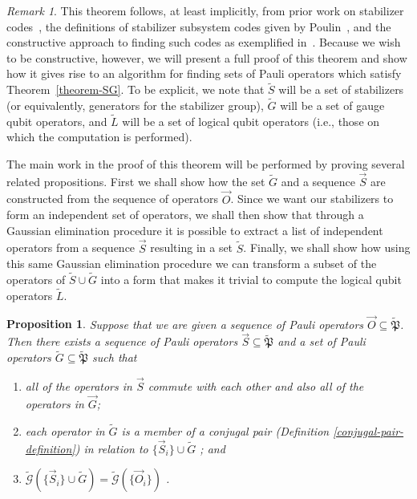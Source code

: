 \documentclass{amsbook}
\theoremstyle{plain}
\newtheorem{proposition}{Proposition}
\theoremstyle{definition}
\theoremstyle{remark}
\newtheorem{remark}{Remark}
\newcommand{\lst}{\vec}
\newcommand{\set}{\tilde}
\newcommand{\genfun}{\tilde{\mathcal{G}}}
\newcommand{\pauligroup}{{\set{\mathfrak{P}}}}
\newcommand{\paren}[1]{\left(#1\right)}
\begin{document}
\begin{remark}
This theorem follows, at least implicitly, from prior work on stabilizer codes~\cite{Gottesman:97a}, the definitions of stabilizer subsystem codes given by Poulin~\cite{Poulin:05a}, and the constructive approach to finding such codes as exemplified in~\cite{Bacon:06a}.  Because we wish to be constructive, however, we will present a full proof of this theorem and show how it gives rise to an algorithm for finding sets of Pauli operators which satisfy Theorem~\ref{theorem-SG}.  To be explicit, we note that $\set S$ will be a set of stabilizers (or equivalently, generators for the stabilizer group), $\set G$ will be a set of gauge qubit operators, and $\set L$ will be a set of logical qubit operators (i.e., those on which the computation is performed).

The main work in the proof of this theorem will be performed by proving several related propositions.  First we shall show how the set $\set G$ and a sequence $\lst S$ are constructed from the sequence of operators $\lst O$.  Since we want our stabilizers to form an independent set of operators, we shall then show that through a Gaussian elimination procedure it is possible to extract a list of independent operators from a sequence $\lst S$ resulting in a set $\set S$.  Finally, we shall show how using this same Gaussian elimination procedure we can transform a subset of the operators of $\set S\cup\set G$ into a form that makes it trivial to compute the logical qubit operators $\set L$.
\end{remark}
\begin{proposition} \label{proposition-SG} Suppose that we are given a sequence of Pauli operators $\lst O\subseteq \pauligroup$.  Then there exists a sequence of Pauli operators $\lst S\subseteq\pauligroup$ and a set of Pauli operators $\set G\subseteq\pauligroup$ such that
\begin{enumerate}
\item all of the operators in $\lst S$ commute with each other and also all of the operators in $\lst G$; \label{stabs-commute-with-G}
\item each operator in $\set G$ is a member of a \emph{conjugal pair} (Definition \ref{conjugal-pair-definition}) in relation to $\{\lst S_i\} \cup \set G $ \label{conjugal-pairs-commute-with-SAG}; and
\item $\genfun\paren{\{\lst S_i\}\cup \set G}=\genfun\paren{\{\lst O_i\}}$ \label{SAG-spans-all}.
\end{enumerate}
\end{proposition}
\end{document}
